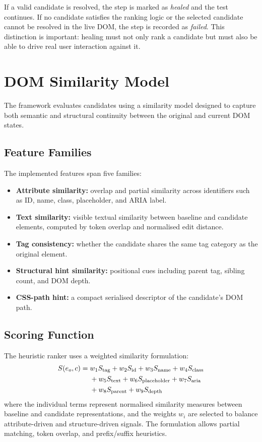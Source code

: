 \documentclass[12pt]{article}
\begin{document}
If a valid candidate is resolved, the step is marked as \emph{healed} and the test continues. If no candidate satisfies the ranking logic or the selected candidate cannot be resolved in the live DOM, the step is recorded as \emph{failed}. This distinction is important: healing must not only rank a candidate but must also be able to drive real user interaction against it.

\section{DOM Similarity Model}
\label{sec:similarity}

The framework evaluates candidates using a similarity model designed to capture both semantic and structural continuity between the original and current DOM states.

\subsection{Feature Families}

The implemented features span five families:

\begin{itemize}[leftmargin=1.2em]
    \item \textbf{Attribute similarity:} overlap and partial similarity across identifiers such as ID, name, class, placeholder, and ARIA label.
    \item \textbf{Text similarity:} visible textual similarity between baseline and candidate elements, computed by token overlap and normalised edit distance.
    \item \textbf{Tag consistency:} whether the candidate shares the same tag category as the original element.
    \item \textbf{Structural hint similarity:} positional cues including parent tag, sibling count, and DOM depth.
    \item \textbf{CSS-path hint:} a compact serialised descriptor of the candidate's DOM path.
\end{itemize}

\subsection{Scoring Function}

The heuristic ranker uses a weighted similarity formulation:
\begin{align}
S(e_o, c) = \; & w_1 S_{\text{tag}} + w_2 S_{\text{id}} + w_3 S_{\text{name}} + w_4 S_{\text{class}} \notag \\
               & + w_5 S_{\text{text}} + w_6 S_{\text{placeholder}} + w_7 S_{\text{aria}} \notag \\
               & + w_8 S_{\text{parent}} + w_9 S_{\text{depth}}
\end{align}
where the individual terms represent normalised similarity measures between baseline and candidate representations, and the weights $w_i$ are selected to balance attribute-driven and structure-driven signals. The formulation allows partial matching, token overlap, and prefix/suffix heuristics.
\end{document}
